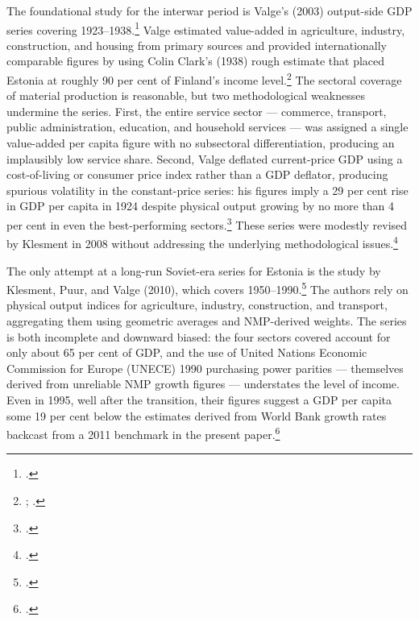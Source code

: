 \documentclass[12pt,a4paper]{article}
\begin{document}
The foundational study for the interwar period is Valge's (2003) output-side GDP series covering 1923--1938.\footnote{\autocite{valge2003all}.} Valge estimated value-added in agriculture, industry, construction, and housing from primary sources and provided internationally comparable figures by using Colin Clark's (1938) rough estimate that placed Estonia at roughly 90 per cent of Finland's income level.\footnote{\autocite[2725]{valge2003all}; \autocite[60]{clark1938}.} The sectoral coverage of material production is reasonable, but two methodological weaknesses undermine the series. First, the entire service sector --- commerce, transport, public administration, education, and household services --- was assigned a single value-added per capita figure with no subsectoral differentiation, producing an implausibly low service share. Second, Valge deflated current-price GDP using a cost-of-living or consumer price index rather than a GDP deflator, producing spurious volatility in the constant-price series: his figures imply a 29 per cent rise in GDP per capita in 1924 despite physical output growing by no more than 4 per cent in even the best-performing sectors.\footnote{\autocite[2726]{valge2003all}.} These series were modestly revised by Klesment in 2008 without addressing the underlying methodological issues.\footnote{\autocite{klesment2008a}.}

The only attempt at a long-run Soviet-era series for Estonia is the study by Klesment, Puur, and Valge (2010), which covers 1950--1990.\footnote{\autocite{klesment2010}.} The authors rely on physical output indices for agriculture, industry, construction, and transport, aggregating them using geometric averages and NMP-derived weights. The series is both incomplete and downward biased: the four sectors covered account for only about 65 per cent of GDP, and the use of United Nations Economic Commission for Europe (UNECE) 1990 purchasing power parities --- themselves derived from unreliable NMP growth figures --- understates the level of income. Even in 1995, well after the transition, their figures suggest a GDP per capita some 19 per cent below the estimates derived from World Bank growth rates backcast from a 2011 benchmark in the present paper.\footnote{\autocite[39--44]{klesment2010}.}
\end{document}
